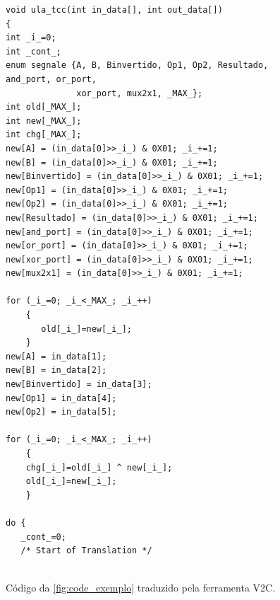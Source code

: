 \begin{figure}[h]
\caption{\label{fig:code_traduzido} Código da \autoref{fig:code_exemplo} traduzido pela ferramenta V2C.}
	\begin{center}
    \begin{minipage}{0.99\textwidth}
    \begin{lstlisting}       
void ula_tcc(int in_data[], int out_data[])
{
int _i_=0;
int _cont_;
enum segnale {A, B, Binvertido, Op1, Op2, Resultado, and_port, or_port, 
              xor_port, mux2x1, _MAX_};
int old[_MAX_];
int new[_MAX_];
int chg[_MAX_];
new[A] = (in_data[0]>>_i_) & 0X01; _i_+=1;
new[B] = (in_data[0]>>_i_) & 0X01; _i_+=1;
new[Binvertido] = (in_data[0]>>_i_) & 0X01; _i_+=1;
new[Op1] = (in_data[0]>>_i_) & 0X01; _i_+=1;
new[Op2] = (in_data[0]>>_i_) & 0X01; _i_+=1;
new[Resultado] = (in_data[0]>>_i_) & 0X01; _i_+=1;
new[and_port] = (in_data[0]>>_i_) & 0X01; _i_+=1;
new[or_port] = (in_data[0]>>_i_) & 0X01; _i_+=1;
new[xor_port] = (in_data[0]>>_i_) & 0X01; _i_+=1;
new[mux2x1] = (in_data[0]>>_i_) & 0X01; _i_+=1;

for (_i_=0; _i_<_MAX_; _i_++)
    {
       old[_i_]=new[_i_];
    }
new[A] = in_data[1];
new[B] = in_data[2];
new[Binvertido] = in_data[3];
new[Op1] = in_data[4];
new[Op2] = in_data[5];

for (_i_=0; _i_<_MAX_; _i_++)
    {
    chg[_i_]=old[_i_] ^ new[_i_];
    old[_i_]=new[_i_];
    }

do {
   _cont_=0;
   /* Start of Translation */


\end{lstlisting}
\end{minipage}
\end{center}
\end{figure}
